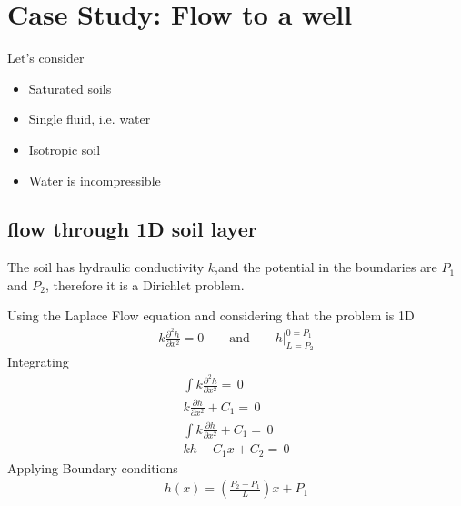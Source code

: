 \documentclass[a4paper, 11pt,article,oneside]{memoir}%
\begin{document}
\section{Case Study: Flow to a well}
Let's consider
\begin{itemize}
\item Saturated soils
\item Single fluid, i.e. water
\item Isotropic soil
\item Water is incompressible
\end{itemize}




\subsection{flow through 1D soil layer}


The soil has hydraulic conductivity $k$,and the potential in the boundaries are $P_1$ and $P_2$, therefore it is a Dirichlet problem.

Using the Laplace Flow equation and considering that the problem is 1D
\begin{align*}
k\frac{\partial^2 h}{\partial x^2}=0\qquad \text{and}\qquad h|^{0=P_1}_{L=P_2}
\end{align*}
Integrating
\begin{gather*}
\int k\frac{\partial^2 h}{\partial x^2}=\,0\\
k\frac{\partial h}{\partial x^2}+C_1=\,0\\
\int k\frac{\partial h}{\partial x^2}+C_1=\,0\\ 
kh+C_1x+C_2=\,0
\end{gather*}
Applying Boundary conditions
\begin{align*}
h(x)=\left(\frac{P_2-P_1}{L}\right)x+P_1
\end{align*}
\end{document}
